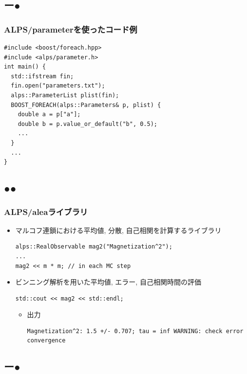 \subsection*{{\protect\color{red}ー}{\protect\color{blue}●}}

\begin{frame}[t,fragile]
  \frametitle{ALPS/parameterを使ったコード例}
  \begin{lstlisting}
#include <boost/foreach.hpp>
#include <alps/parameter.h>
int main() {
  std::ifstream fin;
  fin.open("parameters.txt");
  alps::ParameterList plist(fin);
  BOOST_FOREACH(alps::Parameters& p, plist) {
    double a = p["a"];
    double b = p.value_or_default("b", 0.5);
    ...
  }
  ...
}
\end{lstlisting}
\end{frame}

\subsection*{{\protect\color{red}●}{\protect\color{blue}●}}

\begin{frame}[t,fragile]
  \frametitle{ALPS/aleaライブラリ}
  \begin{itemize}
  \item マルコフ連鎖における平均値, 分散, 自己相関を計算するライブラリ
    \begin{lstlisting}
alps::RealObservable mag2("Magnetization^2");
...
mag2 << m * m; // in each MC step
\end{lstlisting}
  \item ビンニング解析を用いた平均値, エラー, 自己相関時間の評価
    \begin{lstlisting}
std::cout << mag2 << std::endl;
\end{lstlisting}
  \begin{itemize}
  \item 出力
\begin{lstlisting}
Magnetization^2: 1.5 +/- 0.707; tau = inf WARNING: check error convergence
\end{lstlisting}
  \end{itemize}
  \end{itemize}
\end{frame}

\subsection*{{\protect\color{red}ー}{\protect\color{blue}●}}

